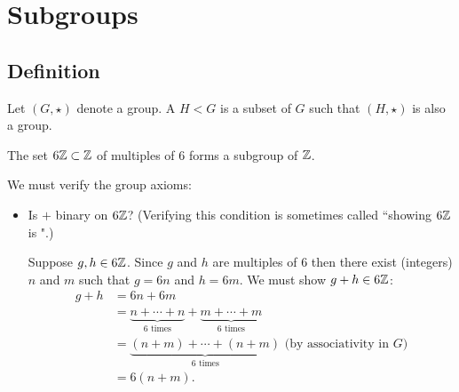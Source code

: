 \documentclass[../algebraNotesMSRI-UP2016.tex]{subfiles}
\begin{document}
\section[\S \thesection]{Subgroups}\label{sec:2p3subgroups}
\subsection[\subsecname]{Definition}
\begin{frame}[c]{\subsecname}
\begin{dfn}
Let $(G,\star)$ denote a group.  A  $H< G$ is a subset of $G$ such that $(H,\star)$ is also a group.  
\end{dfn}
\end{frame}

\begin{frame}
\begin{ex}\label{ex:6Z}
The set $6\mathbb Z\subset \mathbb Z$ of multiples of $6$ forms a subgroup of $\mathbb Z$.  
\end{ex}
%
\pf We must verify the group axioms:
\begin{itemize}
\item Is $+$ binary on $6\mathbb Z$?  (Verifying this condition is sometimes called ``showing $6\mathbb Z$ is ".)  

\smallGap
Suppose $g,h\in 6\mathbb Z$.  Since $g$ and $h$ are multiples of $6$ then there exist (integers) $n$ and $m$ such that $g=6n$ and $h=6m$.  We must show $g+h\in 6\mathbb Z$:
\begin{align*}
g+h &= 6n+6m \\
	&= \underbrace{n+\cdots +n}_{\text{$6$ times}}+\underbrace{m+\cdots +m}_{\text{$6$ times}} \\
	&= \underbrace{(n+m)+\cdots +(n+m)}_{\text{$6$ times}}\text{ (by associativity in $G$)} \\
	&= 6(n+m).
\end{align*}
\end{itemize}
\end{frame}
\end{document}
